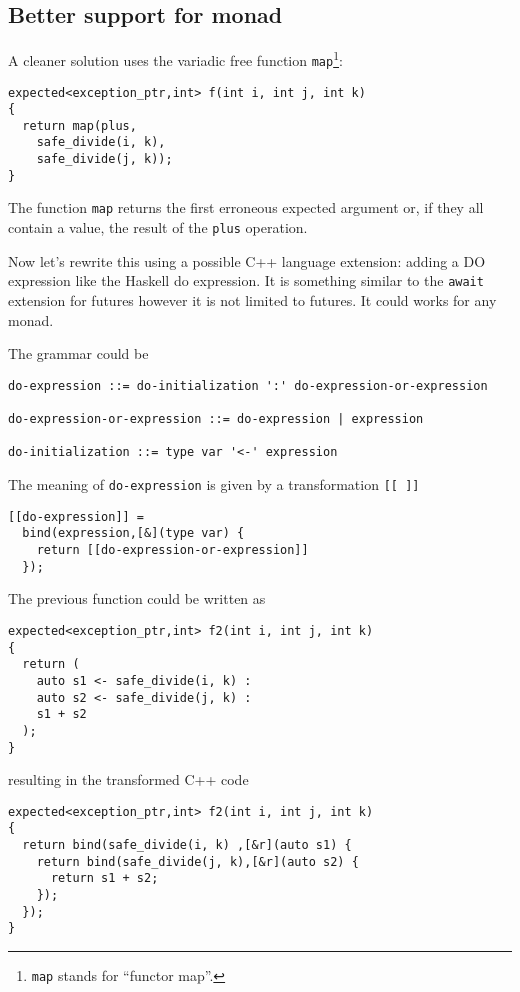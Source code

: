 \documentclass[a4paper,10pt]{article}
\newcommand{\cpp}[1]{\lstinline{#1}}
\begin{document}
\subsection{Better support for monad}
\label{better-support-for-monad}

A cleaner solution uses the variadic free function \cpp{map}\footnote{\cpp{map} stands for ``functor map''.}:

\begin{lstlisting}
expected<exception_ptr,int> f(int i, int j, int k)
{
  return map(plus,
    safe_divide(i, k), 
    safe_divide(j, k));
}
\end{lstlisting}

The function \cpp{map} returns the first erroneous expected argument or, if they all contain a value, the result of the \cpp{plus} operation.


Now let's rewrite this using a possible C++ language extension: adding a DO expression like the Haskell do expression. It is something similar  to the \cpp{await} extension for futures however it is not limited to futures. It could works for any monad.   

The grammar could be

\begin{lstlisting}
do-expression ::= do-initialization ':' do-expression-or-expression

do-expression-or-expression ::= do-expression | expression

do-initialization ::= type var '<-' expression
\end{lstlisting}

The meaning of \cpp{do-expression}  is given by a transformation \cpp{[[ ]]}

\begin{lstlisting}
[[do-expression]] =
  bind(expression,[&](type var) {
    return [[do-expression-or-expression]]
  });
\end{lstlisting}

The previous function could be written as

\begin{lstlisting}
expected<exception_ptr,int> f2(int i, int j, int k)
{
  return (
    auto s1 <- safe_divide(i, k) :
    auto s2 <- safe_divide(j, k) :
    s1 + s2
  );
}
\end{lstlisting}

resulting in the transformed C++ code

\begin{lstlisting}
expected<exception_ptr,int> f2(int i, int j, int k)
{
  return bind(safe_divide(i, k) ,[&r](auto s1) {
    return bind(safe_divide(j, k),[&r](auto s2) {
      return s1 + s2;
    });
  }); 
}
\end{lstlisting}
\end{document}
